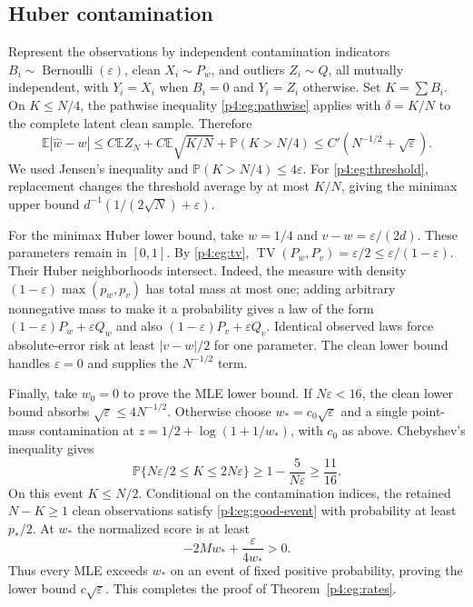 \documentclass[11pt,a4paper]{article}
\theoremstyle{definition}
\theoremstyle{remark}
\numberwithin{equation}{section}
\begin{document}
\subsection{Huber contamination}

Represent the observations by independent contamination indicators
$B_i\sim\operatorname{Bernoulli}(\varepsilon)$, clean
$X_i\sim P_w$, and outliers $Z_i\sim Q$, all mutually independent,
with $Y_i=X_i$ when $B_i=0$ and $Y_i=Z_i$ otherwise. Set
$K=\sum B_i$. On $K\le N/4$, the pathwise inequality
\eqref{p4:eg:pathwise} applies with $\delta=K/N$ to the complete
latent clean sample. Therefore
\[
 \mathbb E|\widehat w-w|
 \le C\mathbb EZ_N+C\mathbb E\sqrt{K/N}
       +\mathbb P(K>N/4)
 \le C'(N^{-1/2}+\sqrt\varepsilon).
\]
We used Jensen's inequality and
$\mathbb P(K>N/4)\le4\varepsilon$.
For \eqref{p4:eg:threshold}, replacement changes the threshold average
by at most $K/N$, giving the minimax upper bound
$d^{-1}(1/(2\sqrt N)+\varepsilon)$.

For the minimax Huber lower bound, take $w=1/4$ and
$v-w=\varepsilon/(2d)$. These parameters remain in $[0,1]$.
By \eqref{p4:eg:tv},
$\operatorname{TV}(P_w,P_v)=\varepsilon/2
\le\varepsilon/(1-\varepsilon)$.
Their Huber neighborhoods intersect. Indeed, the measure with density
$(1-\varepsilon)\max(p_w,p_v)$ has total mass at most one;
adding arbitrary nonnegative mass to make it a probability gives
a law of the form $(1-\varepsilon)P_w+\varepsilon Q_w$
and also $(1-\varepsilon)P_v+\varepsilon Q_v$.
Identical observed laws force absolute-error risk at least
$|v-w|/2$ for one parameter. The clean lower bound handles
$\varepsilon=0$ and supplies the $N^{-1/2}$ term.

Finally, take $w_0=0$ to prove the MLE lower bound.
If $N\varepsilon<16$, the clean lower bound absorbs
$\sqrt\varepsilon\le4N^{-1/2}$. Otherwise choose
$w_*=c_0\sqrt\varepsilon$ and a single point-mass contamination at
$z=1/2+\log(1+1/w_*)$, with $c_0$ as above.
Chebyshev's inequality gives
\[
 \mathbb P\{N\varepsilon/2\le K\le2N\varepsilon\}
 \ge1-\frac5{N\varepsilon}\ge\frac{11}{16}.
\]
On this event $K\le N/2$. Conditional on the contamination indices,
the retained $N-K\ge1$ clean observations satisfy
\eqref{p4:eg:good-event} with probability at least $p_*/2$.
At $w_*$ the normalized score is at least
\[
 -2Mw_*+\frac{\varepsilon}{4w_*}>0.
\]
Thus every MLE exceeds $w_*$ on an event of fixed positive
probability, proving the lower bound $c\sqrt\varepsilon$.
This completes the proof of Theorem~\ref{p4:eg:rates}.
\end{document}
